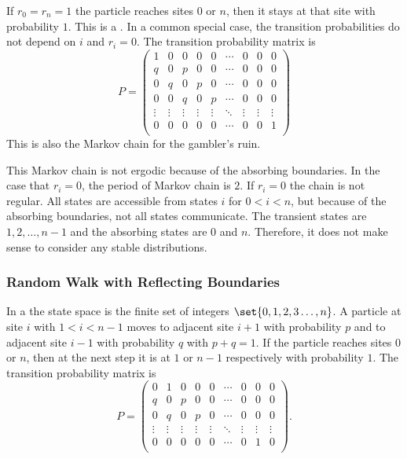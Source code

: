 \documentclass[12pt]{article}
\begin{document}
If \( r_0 = r_n = 1 \) the particle reaches sites \( 0 \) or \( n \),
then it stays at that site with probability \( 1 \).  This is a .  In a common%
special case, the transition probabilities do not depend on \( i \) and \(
r_i = 0 \).  The transition probability matrix is
\[
    P =
    \begin{pmatrix}
        1 & 0 & 0 & 0 & 0 & \cdots & 0 & 0 & 0 \\
        q & 0 & p & 0 & 0 & \cdots & 0 & 0 & 0 \\
        0 & q & 0 & p & 0 & \cdots & 0 & 0 & 0 \\
        0 & 0 & q & 0 & p & \cdots & 0 & 0 & 0 \\
        \vdots & \vdots & \vdots & \vdots & \vdots & \ddots & \vdots
        & \vdots & \vdots \\
        0 & 0 & 0 & 0 & 0 & \cdots & 0 & 0 & 1 \\
    \end{pmatrix}
\] This is also the Markov chain for the gambler's ruin.%

This Markov chain is not ergodic because of the absorbing boundaries.
In the case that \( r_i = 0 \), the period of Markov chain is \( 2 \).
If \( r_i = 0 \) the chain is not regular.  All states are accessible
from states \( i \) for \( 0 < i < n \), but because of the absorbing
boundaries, not all states communicate.  The transient states are \( 1,
2, \dots, n-1 \) and the absorbing states are \( 0 \) and \( n \).
Therefore, it does not make sense to consider any stable distributions.

\subsubsection*{Random Walk with Reflecting Boundaries}

In a  the state space is
the finite set of integers \( \set{0, 1, 2, 3 \dots, n} \).  A particle
at%
site \( i \) with \( 1 < i < n-1 \) moves to adjacent site \( i+1 \)
with probability \( p \) and to adjacent site \( i-1 \) with probability
\( q \) with \( p+q = 1 \).  If the particle reaches sites \( 0 \) or \(
n \), then at the next step it is at \( 1 \) or \( n-1 \) respectively
with probability \( 1 \).  The transition probability matrix is
\[
    P =
    \begin{pmatrix}
        0 & 1 & 0 & 0 & 0 & \cdots & 0 & 0 & 0 \\
        q & 0 & p & 0 & 0 & \cdots & 0 & 0 & 0 \\
        0 & q & 0 & p & 0 & \cdots & 0 & 0 & 0 \\
        \vdots & \vdots & \vdots & \vdots & \vdots & \ddots & \vdots
        & \vdots & \vdots \\
        0 & 0 & 0 & 0 & 0 & \cdots & 0 & 1 & 0 \\
    \end{pmatrix}.
\]
\end{document}
